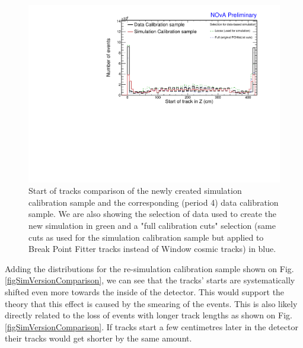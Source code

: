 \begin{figure}[!ht]
\includegraphics[clip, width=\textwidth]{Plots/DataBasedSimulation/DataMCComparison_StartZ.pdf}
\caption{Start of tracks comparison of the newly created simulation calibration sample and the corresponding (period 4) data calibration sample. We are also showing the selection of data used to create the new simulation in green and a "full calibration cuts" selection (same cuts as used for the simulation calibration sample but applied to Break Point Fitter tracks instead of Window cosmic tracks) in blue.}
\label{figDataMCComparison_startZ}
\end{figure}

Adding the distributions for the re-simulation calibration sample shown on Fig. \ref{figSimVersionComparison}, we can see that the tracks' starts are systematically shifted even more towards the inside of the detector. This would support the theory that this effect is caused by the smearing of the events. This is also likely directly related to the loss of events with longer track lengths as shown on Fig. \ref{figSimVersionComparison}. If tracks start a few centimetres later in the detector their tracks would get shorter by the same amount.

